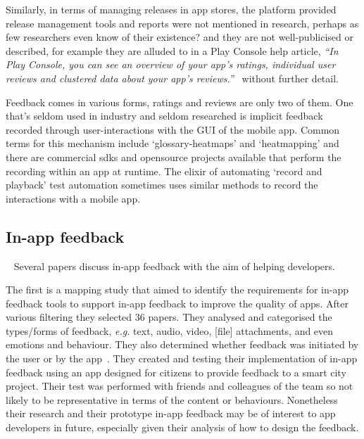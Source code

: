 Similarly, in terms of managing releases in app stores, the platform provided release management tools and reports were not mentioned in research, perhaps as few researchers even know of their existence? and they are not well-publicised or described, for example they are alluded to in a Play Console help article, \emph{``In Play Console, you can see an overview of your app's ratings, individual user reviews and clustered data about your app's reviews.''}~ without further detail.

Feedback comes in various forms, ratings and reviews are only two of them.  One that's seldom used in industry and seldom researched is implicit feedback recorded through user-interactions with the GUI of the mobile app. Common terms for this mechanism include `\glspl{glossary-heatmap}' and `heatmapping' and there are commercial \Glspl{sdk} and opensource projects available that perform the recording within an app at runtime. The elixir of automating `record and playback' test automation sometimes uses similar methods to record the interactions with a mobile app. 

\subsection{In-app feedback}~\label{rw-in-app-feedback-topic}
Several papers discuss in-app feedback with the aim of helping developers. 

The first is a mapping study that aimed to identify the requirements for in-app feedback tools to support in-app feedback to improve the quality of apps. After various filtering they selected 36 papers. They analysed and categorised the types/forms of feedback, \emph{e.g.} text, audio, video, [file] attachments, and even emotions and behaviour. They also determined whether feedback was initiated by the user or by the app~. 
They created and testing their implementation of in-app feedback using an app designed for citizens to provide feedback to a smart city project. Their test was performed with friends and colleagues of the team so not likely to be representative in terms of the content or behaviours. Nonetheless their research and their prototype in-app feedback may be of interest to app developers in future, especially given their analysis of how to design the feedback. 

